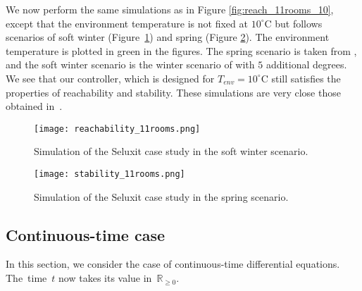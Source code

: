 We now perform the same simulations as in Figure \ref{fig:reach_11rooms_10}, except 
that the environment temperature is not fixed at $10^\circ$C but follows
scenarios of soft winter (Figure~\ref{fig:reach_11rooms}) and spring 
(Figure \ref{fig:reach_11rooms_stab}). The environment temperature is plotted
in green in the figures. The spring scenario is taken from \cite{larsen2015online},
and the soft winter scenario is the winter scenario 
of \cite{larsen2015online} with $5$ additional degrees.
We see that our controller, which is designed for $T_{env} = 10^\circ$C still
satisfies the properties of reachability and stability. These simulations 
are very close those obtained in~\cite{larsen2015online}.

\begin{figure}[ht]
  \centering
 \texttt{[image: reachability\_11rooms.png]}
 \caption{Simulation of the Seluxit case study in the soft winter scenario.}
 \label{fig:reach_11rooms}
\end{figure}


\begin{figure}[ht]
  \centering
 \texttt{[image: stability\_11rooms.png]}
 \caption{Simulation of the Seluxit case study in the spring scenario.}
 \label{fig:reach_11rooms_stab}
\end{figure}










\subsection{Continuous-time case}
\label{sec-continuous}
In this section, we consider the case of continuous-time differential equations.
The~time~$t$ now takes its value in~$\mathbb{R}_{\geq 0}$.
